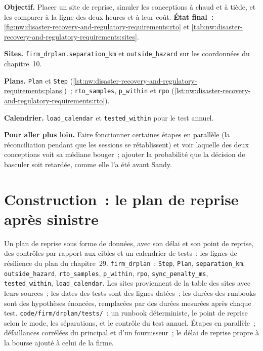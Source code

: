 \begin{tutorial}
\textbf{Objectif.} Placer un site de reprise, simuler les conceptions à chaud et à tiède, et les comparer à la ligne des deux heures et à leur coût.
\textbf{État final~:} \cref{fig:nw:disaster-recovery-and-regulatory-requirements:rto} et
\cref{tab:nw:disaster-recovery-and-regulatory-requirements:sites}.
\begin{tutsteps}
\item \textbf{Sites.} \texttt{firm\_drplan.separation\_km} et \texttt{outside\_hazard} sur les coordonnées du chapitre~10.
\item \textbf{Plans.} \texttt{Plan} et \texttt{Step} (\cref{lst:nw:disaster-recovery-and-regulatory-requirements:plans})~;
  \texttt{rto\_samples}, \texttt{p\_within} et \texttt{rpo} (\cref{lst:nw:disaster-recovery-and-regulatory-requirements:rto}).
\item \textbf{Calendrier.} \texttt{load\_calendar} et \texttt{tested\_within} pour le test annuel.
\end{tutsteps}
\textbf{Pour aller plus loin.} Faire fonctionner certaines étapes en parallèle (la réconciliation pendant que les sessions se rétablissent) et voir laquelle
des deux conceptions voit sa médiane bouger~; ajouter la probabilité que la décision de basculer soit retardée, comme elle l'a été avant Sandy.
\end{tutorial}

\section{Construction~: le plan de reprise après sinistre}\label{bld:nw:disaster-recovery-and-regulatory-requirements:drplan}

\begin{build}
 Un plan de reprise sous forme de données, avec son délai et son point de reprise, des contrôles par rapport aux cibles et un calendrier de tests~: les
lignes de résilience du plan du chapitre~29.
 \texttt{firm\_drplan}~: \texttt{Step}, \texttt{Plan}, \texttt{separation\_km}, \texttt{outside\_hazard},
\texttt{rto\_samples}, \texttt{p\_within}, \texttt{rpo}, \texttt{sync\_penalty\_ms}, \texttt{tested\_within}, \texttt{load\_calendar}.
 Les sites proviennent de la table des sites avec leurs sources~; les dates des tests sont des lignes datées~; les durées des runbooks sont des hypothèses énoncées,
remplacées par des durées mesurées après chaque test.
 \texttt{code/firm/drplan/tests/}~: un runbook déterministe, le point de reprise selon le mode, les séparations, et le
contrôle du test annuel.
 Étapes en parallèle~; défaillances corrélées du principal et d'un fournisseur~; le délai de reprise propre à la bourse ajouté à celui de la firme.
\end{build}

